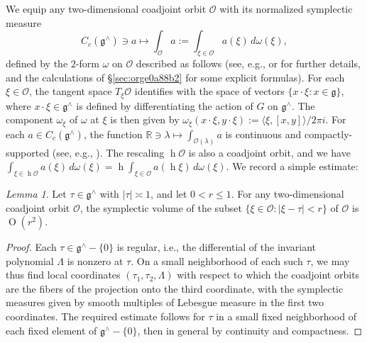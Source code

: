 \documentclass[reqno,10pt]{amsart}
\theoremstyle{plain} %
\theoremstyle{definition}
\theoremstyle{plain} %
\theoremstyle{remark}
\theoremstyle{itplain} %
\newtheorem*{lemma*}{Lemma}
\theoremstyle{remark} %
\renewcommand{\leq}{\leqslant}
\numberwithin{equation}{section}
\def\O{\operatorname{O}}
\DeclareMathOperator{\h}{h}
\begin{document}
We equip any two-dimensional coadjoint orbit $\mathcal{O}$ with its normalized symplectic measure
\begin{equation*}
C_c(\mathfrak{g}^\wedge) \ni a \mapsto \int_{\mathcal{O}} a := \int_{\xi \in \mathcal{O}} a(\xi) \, d \omega(\xi),
\end{equation*}
defined by the $2$-form $\omega$ on $\mathcal{O}$ described as follows (see, e.g., \cite[\S6]{nelson-venkatesh-1} or \cite{MR1701415} for further details, and the calculations of \S\ref{sec:orge0a88b2} for some explicit formulas).  For each $\xi \in \mathcal{O}$, the tangent space $T_\xi \mathcal{O}$ identifies with the space of vectors $\{x \cdot \xi : x \in \mathfrak{g}\}$, where $x \cdot \xi \in \mathfrak{g}^\wedge$ is defined by differentiating the action of $G$ on $\mathfrak{g}^\wedge$.  The component $\omega_\xi$ of $\omega$ at $\xi$ is then given by $\omega_{\xi}(x \cdot \xi, y \cdot \xi) := \langle \xi, [x,y] \rangle/2 \pi i$.  For each $a \in C_c(\mathfrak{g}^\wedge)$, the function $\mathbb{R} \ni \lambda \mapsto \int_{\mathcal{O}(\lambda)} a$ is continuous and compactly-supported (see, e.g., \cite[\S11.2]{nelson-venkatesh-1}).  The rescaling $\h \mathcal{O}$ is also a coadjoint orbit, and we have $\int_{\xi \in \h \mathcal{O}} a(\xi) \, d \omega (\xi ) = \h \int_{\xi \in \mathcal{O}} a(\h \xi) \, d \omega (\xi )$.  We record a simple estimate:
\begin{lemma*}
  Let $\tau \in \mathfrak{g}^\wedge$ with $|\tau| \asymp 1$, and let $0 < r \leq 1$.  For any two-dimensional coadjoint orbit $\mathcal{O}$, the symplectic volume of the subset $\{\xi \in \mathcal{O} : |\xi - \tau| < r\}$ of $\mathcal{O}$ is $\O(r^2)$.
\end{lemma*}
\begin{proof}
  Each $\tau \in \mathfrak{g}^\wedge - \{0\}$ is regular, i.e., the differential of the invariant polynomial $\Lambda$ is nonzero at $\tau$.  On a small neighborhood of each such $\tau$, we may thus find local coordinates $(\tau_1,\tau_2,\Lambda)$ with respect to which the coadjoint orbits are the fibers of the projection onto the third coordinate, with the symplectic measures given by smooth multiples of Lebesgue measure in the first two coordinates.  The required estimate follows for $\tau$ in a small fixed neighborhood of each fixed element of $\mathfrak{g}^\wedge - \{0\}$, then in general by continuity and compactness.
\end{proof}
\end{document}
